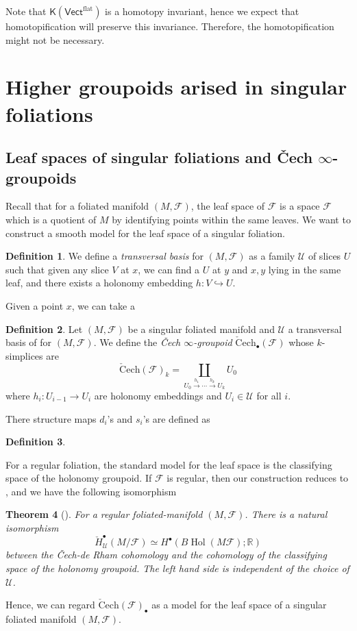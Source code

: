 \documentclass[12pt]{amsart}
\newtheorem{thm}{Theorem}[section]
\theoremstyle{definition}
\newtheorem{defn}[thm]{Definition}
\theoremstyle{remark}
\numberwithin{equation}{section}
\newcommand{\CF}{{\mathcal F}}
\newcommand{\R}{{\mathbb{R}}}
\newcommand{\1}{{\mathbb{1}}}
\newcommand{\Flat}{{\operatorname{flat}}}
\newcommand{\vect}{\mathsf{Vect}}
\newcommand{\bt}{\bullet}
\newcommand{\hol}{\operatorname{Hol}}
\newcommand{\cech}{\operatorname{\check{C}ech}}
\begin{document}
Note that $\mathsf{K}(\vect^{\Flat})$ is a homotopy invariant, hence we expect that homotopification will preserve this invariance. Therefore, the homotopification might not be necessary.




\section{Higher groupoids arised in singular foliations}
\subsection{Leaf spaces of singular foliations and \v{C}ech $\infty$-groupoids} 
Recall that for a foliated manifold $(M, \CF)$, the leaf space of $\CF$ is a space $\CF$ which is a quotient of $M$ by identifying points within the same leaves. We want to construct a smooth model for the leaf space of a singular foliation. 
\begin{defn}
    We define a {\it transversal basis} for $(M, \CF)$ as a family $\mathcal{U}$ of slices $U$ such that given any slice $V$ at $x$, we can find a $U$ at $y$ and $x, y$ lying in the same leaf, and there exists a holonomy embedding $h: V\hookrightarrow U$.   
\end{defn}

Given a point $x$, we can take a 

\begin{defn}
    Let $(M, \CF)$ be a singular foliated manifold and $\mathcal{U}$ a transversal basis of for $(M, \CF)$. We define the {\it \v{C}ech $\infty$-groupoid} $\cech_{\bt}(\CF)$ whose  $k$-simplices are
    \begin{equation*}
        \cech(\CF)_k = \coprod_{U_0\stackrel{h_1}{\to}\cdots\stackrel{h_k}{\to} U_k} U_0
    \end{equation*}
    where $h_i: U_{i-1}\to U_i$ are holonomy embeddings and $U_i\in \mathcal{U}$ for all $i$.
    
    There structure maps $d_i$'s and $s_i$'s are defined as 
\end{defn}

\begin{defn}

\end{defn}
For a regular foliation, the standard model for the leaf space is the classifying space of the holonomy groupoid. If $\CF$ is regular, then our construction reduces to \cite{CM00}, and we have the following isomorphism
\begin{thm}[\cite{CM00}]
    For a regular foliated-manifold $(M, \CF)$. There is a natural isomorphism
    $$
    \check{H}^{\bt}_{\mathcal{U}}(M/\CF) \simeq H^{\bt}(B\hol(M\CF); \R)
    $$ between the \v{C}ech-de Rham cohomology and the cohomology of the classifying space of the holonomy groupoid. The left hand side is independent of the choice of $\mathcal{U}$.
\end{thm}
Hence, we can regard $\cech(\CF)_{\bt}$ as a model for the leaf space of a singular foliated manifold $(M, \CF)$.
\end{document}
